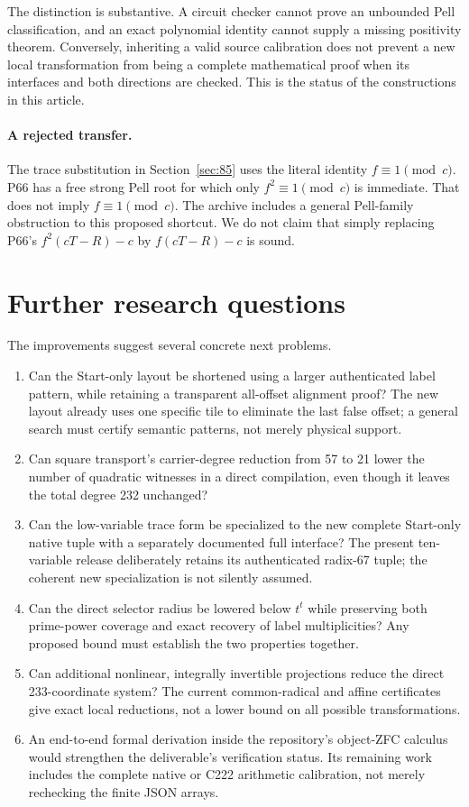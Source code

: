 \documentclass[10pt,letterpaper]{article}
\theoremstyle{remark}\newtheorem{remark}[theorem]{Remark}
\begin{document}
The distinction is substantive. A circuit checker cannot prove an
unbounded Pell classification, and an exact polynomial identity cannot
supply a missing positivity theorem. Conversely, inheriting a valid source
calibration does not prevent a new local transformation from being a
complete mathematical proof when its interfaces and both directions are
checked. This is the status of the constructions in this article.

\paragraph{A rejected transfer.}
The trace substitution in Section~\ref{sec:85} uses the literal identity
$f\equiv1\pmod c$. P66 has a free strong Pell root for which only
$f^2\equiv1\pmod c$ is immediate. That does not imply $f\equiv1\pmod c$.
The archive includes a general Pell-family obstruction to this proposed
shortcut. We do not claim that simply replacing P66's $f^2(cT-R)-c$
by $f(cT-R)-c$ is sound.

\section{Further research questions}

The improvements suggest several concrete next problems.
\begin{enumerate}
\item Can the Start-only layout be shortened using a larger authenticated
label pattern, while retaining a transparent all-offset alignment proof?
The new layout already uses one specific tile to eliminate the last
false offset; a general search must certify semantic patterns, not merely
physical support.
\item Can square transport's carrier-degree reduction from 57 to 21
lower the number of quadratic witnesses in a direct compilation, even
though it leaves the total degree 232 unchanged?
\item Can the low-variable trace form be specialized to the new complete
Start-only native tuple with a separately documented full interface?
The present ten-variable release deliberately retains its authenticated
radix-67 tuple; the coherent new specialization is not silently assumed.
\item Can the direct selector radius be lowered below $t^t$ while preserving
both prime-power coverage and exact recovery of label multiplicities?
Any proposed bound must establish the two properties together.
\item Can additional nonlinear, integrally invertible projections reduce
the direct 233-coordinate system? The current common-radical and affine
certificates give exact local reductions, not a lower bound on all
possible transformations.
\item An end-to-end formal derivation inside the repository's object-ZFC
calculus would strengthen the deliverable's verification status. Its
remaining work includes the complete native or C222 arithmetic calibration,
not merely rechecking the finite JSON arrays.
\end{enumerate}
\end{document}
